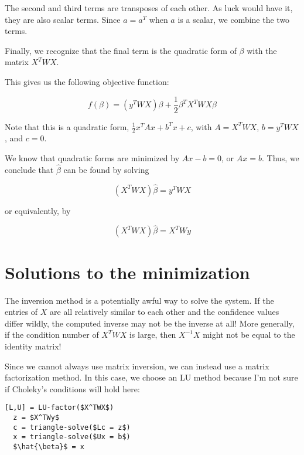 \documentclass{article}
\begin{document}
The second and third terms are transposes of each other. As luck would have it,
they are also scalar terms. Since $a = a^T$ when $a$ is a scalar, we combine the
two terms.

Finally, we recognize that the final term is the quadratic form of $\beta$ with
the matrix $X^TWX$.

This gives us the following objective function:

\[
 f(\beta) = (y^T W X) \beta + \frac{1}{2} \beta^T X^T W X \beta 
\]

Note that this is a quadratic form, $\frac{1}{2}x^TAx + b^Tx + c$, with $A =
X^TWX$, $b=y^TWX$, and $c=0$.

We know that quadratic forms are minimized by $Ax - b = 0$, or $Ax = b$. Thus,
we conclude that $\hat{\beta}$ can be found by solving

\[
  (X^TWX)\hat{\beta} = y^TWX
\]

or equivalently, by

\[
  (X^TWX)\hat{\beta} = X^TWy
\]

\section{Solutions to the minimization}

The inversion method is a potentially awful way to solve the system. If the
entries of $X$ are all relatively similar to each other and the confidence
values differ wildly, the computed inverse may not be the inverse at all! More
generally, if the condition number of $X^TWX$ is large, then $X^{-1}X$ might not
be equal to the identity matrix!


Since we cannot always use matrix inversion, we can instead use a matrix
factorization method. In this case, we choose an LU method because I'm not sure
if Choleky's conditions will hold here:

\begin{lstlisting}[mathescape = true]
  [L,U] = LU-factor($X^TWX$)
  z = $X^TWy$
  c = triangle-solve($Lc = z$)
  x = triangle-solve($Ux = b$)
  $\hat{\beta}$ = x
\end{lstlisting}
\end{document}

